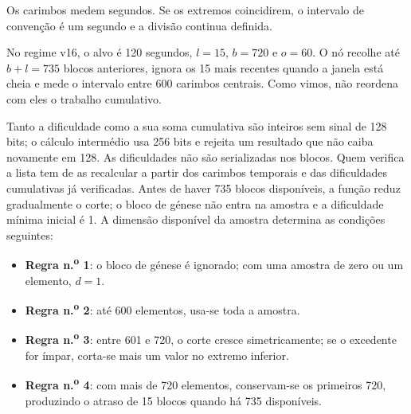 %
Os carimbos medem segundos. Se os extremos coincidirem, o intervalo de
convenção é um segundo e a divisão continua definida.

%
No regime v16, o alvo é 120 segundos, $l=15$, $b=720$ e
$o=60$. O nó recolhe até $b+l=735$ blocos anteriores, ignora os 15 mais
recentes quando a janela está cheia e mede o intervalo entre 600 carimbos
centrais. Como vimos, não reordena com eles o trabalho cumulativo.

Tanto a dificuldade como a sua soma cumulativa são inteiros sem sinal de 128
bits; o cálculo intermédio usa 256 bits e rejeita um resultado que não caiba
novamente em 128.
%
As dificuldades não são serializadas nos blocos. Quem verifica a lista tem de
as recalcular a partir dos carimbos temporais e das dificuldades cumulativas
já verificadas. Antes de haver 735 blocos disponíveis, a função reduz
gradualmente o corte; o bloco de génese não entra na amostra e a dificuldade
mínima inicial é 1. A dimensão disponível da amostra determina as condições
seguintes:
\begin{itemize}
    \item[] \textbf{Regra n.\textsuperscript{o} 1}: o bloco de génese é ignorado; com uma amostra de zero ou um elemento, $d=1$.
    \item[] \textbf{Regra n.\textsuperscript{o} 2}: até 600 elementos, usa-se toda a amostra.
    \item[] \textbf{Regra n.\textsuperscript{o} 3}: entre 601 e 720, o corte cresce simetricamente; se o excedente for ímpar, corta-se mais um valor no extremo inferior.
    \item[] \textbf{Regra n.\textsuperscript{o} 4}: com mais de 720 elementos, conservam-se os primeiros 720, produzindo o atraso de 15 blocos quando há 735 disponíveis.
\end{itemize}

